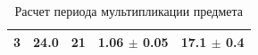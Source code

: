 \begin{table}[]
\begin{tabular}{|c|c|c|l|l|}
3                                                                    & 24.0                                                                                                          & 21                                                                                             & 1.06 $\pm$ 0.05                                                                                                                                & 17.1 $\pm$ 0.4                                                                                         \\ \hline
\end{tabular}
\caption{Расчет периода мультипликации предмета}
\label{tab:1}
\end{table}